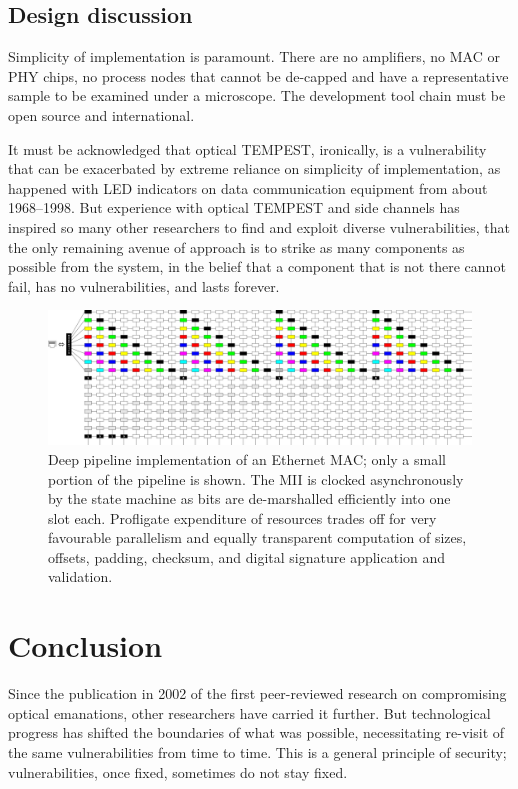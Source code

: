 \documentclass[conference]{IEEEtran}
\begin{document}
\subsection{Design discussion}

Simplicity of implementation is paramount. There are no amplifiers, no MAC
or PHY chips, no process nodes that cannot be de-capped and have a
representative sample to be examined under a microscope. The development tool
chain must be open source and international.

It must be acknowledged that optical TEMPEST, ironically, is a vulnerability
that can be exacerbated by extreme reliance on simplicity of implementation,
as happened with LED indicators on data communication equipment from about
1968--1998.
But experience with optical TEMPEST and side channels has inspired so many
other researchers to find and exploit diverse vulnerabilities, that the only
remaining avenue of approach is to strike as many components as possible from
the system, in the belief that a component that is not there cannot fail, has
no vulnerabilities, and lasts forever.

\begin{figure}[!t]
    \centering
	\includegraphics[width=\textwidth]{deep_pipeline.png}
	\caption{Deep pipeline implementation of an Ethernet MAC; only a small
        portion of the pipeline is shown. The MII is clocked asynchronously
        by the state machine as bits are de-marshalled efficiently into one
        slot each. Profligate expenditure of resources trades off for very
        favourable parallelism and equally transparent computation of sizes,
        offsets, padding, checksum, and digital signature application and
        validation.}
	\label{figure:deep_pipeline}
\end{figure}

\section{Conclusion}

Since the publication in 2002 of the first peer-reviewed research on
compromising optical emanations, other researchers have carried it further.
But technological progress has shifted the boundaries of what was possible,
necessitating re-visit of the same vulnerabilities from time to time. This is
a general principle of security; vulnerabilities, once fixed, sometimes do
not stay fixed.
\end{document}
